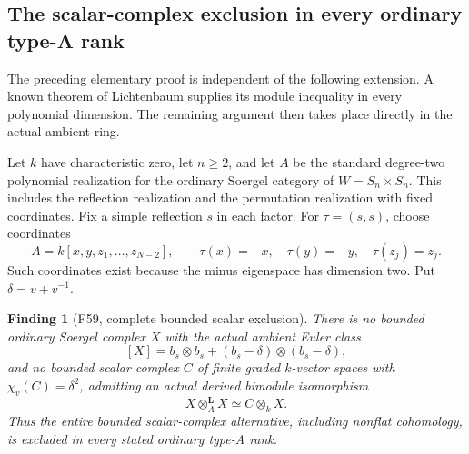 \documentclass[11pt,a4paper]{article}
\newcommand{\fid}[1]{\textsf{#1}}\newcommand{\gate}[1]{\textsf{#1}}
\theoremstyle{named}\newtheorem{finding}{Finding}[section]
\theoremstyle{definition}\newtheorem{definition}[finding]{Definition}
\theoremstyle{remark}\newtheorem{remark}[finding]{Remark}
\begin{document}
\subsection{The scalar-complex exclusion in every ordinary type-A rank}

The preceding elementary proof is independent of the
following extension. A known theorem of Lichtenbaum
supplies its module inequality in every polynomial
dimension. The remaining argument then takes place
directly in the actual ambient ring.

Let \(k\) have characteristic zero, let \(n\ge2\), and
let \(A\) be the standard degree-two polynomial
realization for the ordinary Soergel category of
\(W=S_n\times S_n\). This includes the reflection
realization and the permutation realization with
fixed coordinates. Fix a simple reflection \(s\)
in each factor. For \(\tau=(s,s)\), choose coordinates
\[
 A=k[x,y,z_1,\ldots,z_{N-2}],\qquad
 \tau(x)=-x,\quad \tau(y)=-y,\quad\tau(z_j)=z_j.
\]
Such coordinates exist because the minus eigenspace
has dimension two. Put \(\delta=v+v^{-1}\).

\begin{finding}[\fid{F59}, complete bounded scalar exclusion]
\label{f:allRankScalarClosure}
There is no bounded ordinary Soergel complex \(X\)
with the actual ambient Euler class
\[
 [X]=b_s\otimes b_s+(b_s-\delta)\otimes(b_s-\delta),
\]
and no bounded scalar complex \(C\) of finite graded
\(k\)-vector spaces with \(\chi_v(C)=\delta^2\),
admitting an actual derived bimodule isomorphism
\begin{equation}\label{eq:allRankScalarQuadratic}
 X\otimes_A^{\mathbf L}X\simeq C\otimes_kX.
\end{equation}
Thus the entire bounded scalar-complex alternative,
including nonflat cohomology, is excluded in every
stated ordinary type-A rank.
\end{finding}
\end{document}
